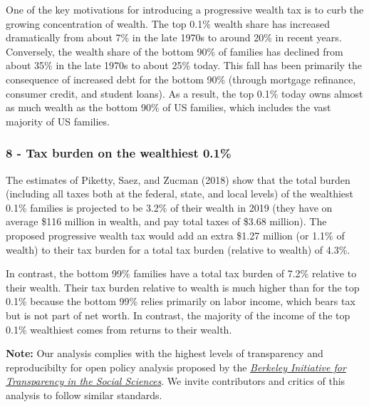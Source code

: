 \documentclass[]{article}
\begin{document}
One of the key motivations for introducing a progressive wealth tax is
to curb the growing concentration of wealth. The top 0.1\% wealth share
has increased dramatically from about 7\% in the late 1970s to around
20\% in recent years. Conversely, the wealth share of the bottom 90\% of
families has declined from about 35\% in the late 1970s to about 25\%
today. This fall has been primarily the consequence of increased debt
for the bottom 90\% (through mortgage refinance, consumer credit, and
student loans). As a result, the top 0.1\% today owns almost as much
wealth as the bottom 90\% of US families, which includes the vast
majority of US families.

\hypertarget{tax-burden-on-the-wealthiest-0.1}{%
\subsubsection{8 - Tax burden on the wealthiest
0.1\%}\label{tax-burden-on-the-wealthiest-0.1}}

The estimates of Piketty, Saez, and Zucman (2018) show that the total
burden (including all taxes both at the federal, state, and local
levels) of the wealthiest 0.1\% families is projected to be 3.2\% of
their wealth in 2019 (they have on average \$116 million in wealth, and
pay total taxes of \$3.68 million). The proposed progressive wealth tax
would add an extra \$1.27 million (or 1.1\% of wealth) to their tax
burden for a total tax burden (relative to wealth) of 4.3\%.

In contrast, the bottom 99\% families have a total tax burden of 7.2\%
relative to their wealth. Their tax burden relative to wealth is much
higher than for the top 0.1\% because the bottom 99\% relies primarily
on labor income, which bears tax but is not part of net worth. In
contrast, the majority of the income of the top 0.1\% wealthiest comes
from returns to their wealth.

\textbf{Note:} Our analysis complies with the highest levels of
transparency and reproducibilty for open policy analysis proposed by the
\href{https://www.bitss.org/opa/}{\emph{Berkeley Initiative for
Transparency in the Social Sciences}}. We invite contributors and
critics of this analysis to follow similar standards.
\end{document}
